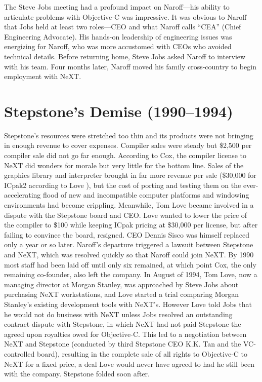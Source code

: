 \documentclass[acmsmall,screen]{acmart}
\begin{document}
The Steve Jobs meeting had a profound impact on Naroff---his ability to articulate problems with Objective-C was impressive. It was obvious to Naroff that Jobs held at least two roles---CEO and what Naroff calls ``CEA'' (Chief Engineering Advocate). His hands-on leadership of engineering issues was energizing for Naroff, who was more accustomed with CEOs who avoided technical details. Before returning home, Steve Jobs asked Naroff to interview with his team. Four months later, Naroff moved his family cross-country to begin employment with NeXT. 

\section{Stepstone's Demise (1990--1994)}
\label{sec-stepstones_demise1990-1994}
Stepstone's resources were stretched too thin and its products were not bringing in enough revenue to cover expenses. Compiler sales were steady but \$2,500 per compiler sale did not go far enough. According to Cox, the compiler license to NeXT did wonders for morale but very little for the bottom line. Sales of the graphics library and interpreter brought in far more revenue per sale (\$30,000 for ICpak2 according to Love \citetext{\citeyear[16--17, 31]{love_skype_2019}}), but the cost of porting and testing them on the ever-accelerating flood of new and incompatible computer platforms and windowing environments had become crippling. Meanwhile, Tom Love became involved in a dispute with the Stepstone board and CEO. Love wanted to lower the price of the compiler to \$100 while keeping ICpak pricing at \$30,000 per license, but after failing to convince the board, resigned. CEO Dennis Sisco was himself replaced only a year or so later. Naroff's departure triggered a lawsuit between Stepstone and NeXT, which was resolved quickly so that Naroff could join NeXT. By 1990 most staff had been laid off until only six remained, at which point Cox, the only remaining co-founder, also left the company. In August of 1994, Tom Love, now a managing director at Morgan Stanley, was approached by Steve Jobs about purchasing NeXT workstations, and Love started a trial comparing Morgan Stanley's existing development tools with NeXT's. However Love told Jobs that he would not do business with NeXT unless Jobs resolved an outstanding contract dispute with Stepstone, in which NeXT had not paid Stepstone the agreed upon royalties owed for Objective-C. This led to a negotiation between NeXT and Stepstone (conducted by third Stepstone CEO K.K. Tan and the VC-controlled board), resulting in the complete sale of all rights to Objective-C to NeXT for a fixed price, a deal Love would never have agreed to had he still been with the company. Stepstone folded soon after.
\end{document}
